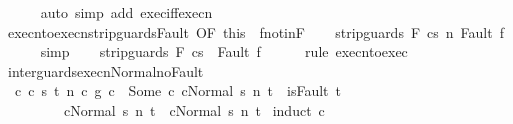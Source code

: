\begin{isabellebody}
\ \ \ \ \isamarkupfalse%
\ {\isacharparenleft}auto\ simp\ add{\isacharcolon}\ exec{\isacharunderscore}iff{\isacharunderscore}execn{\isacharparenright}\isanewline
\ \ \isamarkupfalse%
\ execn{\isacharunderscore}to{\isacharunderscore}execn{\isacharunderscore}strip{\isacharunderscore}guards{\isacharunderscore}Fault\ {\isacharbrackleft}OF\ this\ {\isacharunderscore}\ f{\isacharunderscore}notin{\isacharunderscore}F{\isacharbrackright}\isanewline
\ \ \isamarkupfalse%
\ {\isachardoublequoteopen}{\isasymGamma}{\isasymturnstile}{\isasymlangle}strip{\isacharunderscore}guards\ F\ c{\isacharcomma}s{\isasymrangle}\ {\isacharequal}n{\isasymRightarrow}\ Fault\ f{\isachardoublequoteclose}\isanewline
\ \ \ \ \isamarkupfalse%
\ simp\isanewline
\ \ \isamarkupfalse%
\ {\isachardoublequoteopen}{\isasymGamma}{\isasymturnstile}{\isasymlangle}strip{\isacharunderscore}guards\ F\ c{\isacharcomma}s{\isasymrangle}\ {\isasymRightarrow}\ Fault\ f{\isachardoublequoteclose}\isanewline
\ \ \ \ \isamarkupfalse%
\ {\isacharparenleft}rule\ execn{\isacharunderscore}to{\isacharunderscore}exec{\isacharparenright}\isanewline
{}\isamarkupfalse%
%
\endisatagproof
{\isafoldproof}%
%
\isadelimproof
%
\endisadelimproof
%
\isamarkuptrue%
\isamarkupfalse%
\ inter{\isacharunderscore}guards{\isacharunderscore}execn{\isacharunderscore}Normal{\isacharunderscore}noFault{\isacharcolon}\ \isanewline
\ \ {\isachardoublequoteopen}{\isasymAnd}c\ c{}\ s\ t\ n{\isachardot}\ {\isasymlbrakk}{\isacharparenleft}c{}\ {\isasyminter}\isactrlsub g\ c{}{\isacharparenright}\ {\isacharequal}\ Some\ c{\isacharsemicolon}\ {\isasymGamma}{\isasymturnstile}{\isasymlangle}c{\isacharcomma}Normal\ s{\isasymrangle}\ {\isacharequal}n{\isasymRightarrow}\ t{\isacharsemicolon}\ {\isasymnot}\ isFault\ t{\isasymrbrakk}\isanewline
\ \ \ \ \ \ \ \ {\isasymLongrightarrow}\ {\isasymGamma}{\isasymturnstile}{\isasymlangle}c{}{\isacharcomma}Normal\ s{\isasymrangle}\ {\isacharequal}n{\isasymRightarrow}\ t\ {\isasymand}\ {\isasymGamma}{\isasymturnstile}{\isasymlangle}c{}{\isacharcomma}Normal\ s{\isasymrangle}\ {\isacharequal}n{\isasymRightarrow}\ t{\isachardoublequoteclose}\isanewline
%
\isadelimproof
%
\endisadelimproof
%
\isatagproof
{}\isamarkupfalse%
\ {\isacharparenleft}induct\ c{}{\isacharparenright}\isanewline

\end{isabellebody}
